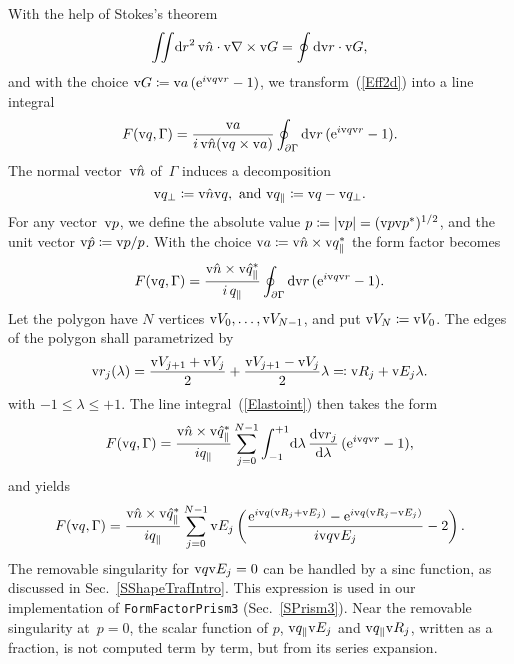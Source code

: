 With the help of Stokes's theorem
\begin{equation}\label{EStokes}
  \iint\!\text{d} r^2\,\text{v}{\hat n}\cdot\text{v}{\nabla}\times\text{v}{G} = \oint \text{d}\text{v}{r}\cdot\text{v}{G},
\end{equation}
and with the choice $\text{v}{G}\coloneqq\text{v}{a}\, (\text{e}^{i\text{v}{q}\text{v}{r}}-1)$,
we transform~(\ref{Eff2d}) into a line integral
\begin{equation}
  F(\text{v}{q},\Gamma)=\frac{\text{v}{a}}{i\, \text{v}{\hat n}(\text{v}{q}\times\text{v}{a})} \oint_{\partial\Gamma} \text{d}\text{v}{r}\,(\text{e}^{i\text{v}{q}\text{v}{r}}-1).
\end{equation}
The normal vector~$\text{v}{\hat n}$ of~$\Gamma$ induces a decomposition
\begin{equation}
  \text{v}{q}_\perp\coloneqq\text{v}{\hat n}\text{v}{q},\text{~and~}\text{v}{q}_\parallel\coloneqq\text{v}{q}-\text{v}{q}_\perp.
\end{equation}
For any vector~$\text{v}{p}$, we define the absolute value
$p\coloneqq|\text{v}{p}|=(\text{v}{p}\text{v}{p}^*)^{1/2}$,
and the unit vector $\text{v}{\hat p}\coloneqq\text{v}{p}/p$.
With the choice $\text{v}{a}\coloneqq\text{v}{\hat n}\times\text{v}{q}_\parallel^*$
the form factor becomes
\begin{equation}\label{Elastoint}
  F(\text{v}{q},\Gamma)=\frac{\text{v}{\hat n}\times\text{v}{\hat q}_\parallel^*}{i\,q_\parallel} \oint_{\partial\Gamma} \text{d}\text{v}{r}\,(\text{e}^{i\text{v}{q}\text{v}{r}}-1).
\end{equation}
Let the polygon have $N$ vertices $\text{v}{V}_0,\ldots,\text{v}{V}_{N-1}$,
and put $\text{v}{V}_N\coloneqq\text{v}{V}_0$.
The edges of the polygon shall parametrized by
\begin{equation}
  \text{v}{r}_j(\lambda) = \frac{\text{v}{V}_{j+1}+\text{v}{V}_j}{2} + \frac{\text{v}{V}_{j+1}-\text{v}{V}_j}{2} \lambda
  \eqqcolon \text{v}{R}_j + \text{v}{E}_j\lambda.
\end{equation}
with $-1\le\lambda\le+1$.
The line integral~(\ref{Elastoint}) then takes the form
\begin{equation}
    F(\text{v}{q},\Gamma)
   = \frac{\text{v}{\hat n}\times\text{v}{\hat q}_\parallel^*}{iq_\parallel} \sum_{j=0}^{N-1}
              \int_{-1}^{+1}\!\text{d}\lambda\, \frac{\text{d}\text{v}{r}_j}{\text{d}\lambda}\,(\text{e}^{i\text{v}{q}\text{v}{r}}-1),
\end{equation}
and yields
\begin{equation}\label{Effpolygon1}
    F(\text{v}{q},\Gamma)
    = \frac{\text{v}{\hat n}\times\text{v}{\hat q}_\parallel^*}{iq_\parallel}
      \sum_{j=0}^{N-1} \text{v}{E}_j
      \left( \frac{\text{e}^{i\text{v}{q}(\text{v}{R}_j+\text{v}{E}_j)}-\text{e}^{i\text{v}{q}(\text{v}{R}_j-\text{v}{E}_j)}}{i\text{v}{q}\text{v}{E}_j} - 2 \right).
\end{equation}
The removable singularity for $\text{v}{q}\text{v}{E}_j=0$
can be handled by a sinc function, as discussed in Sec.~\ref{SShapeTrafIntro}.
This expression is used in our implementation of \texttt{FormFactorPrism3}
(Sec.~\ref{SPrism3}).
Near the removable singularity at~$p=0$,
the scalar function of $p$, $\text{v}{q}_\parallel\text{v}{E}_j$ and $\text{v}{q}_\parallel\text{v}{R}_j$,
written as a fraction,
 is not computed term by term,
but from its series expansion.

